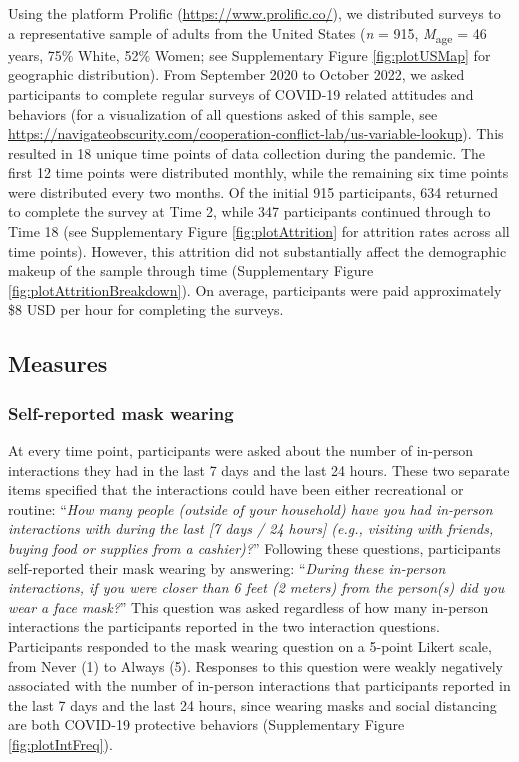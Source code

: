 \documentclass[
  man, donotrepeattitle,floatsintext]{apa6}
\begin{document}
Using the platform Prolific (\url{https://www.prolific.co/}), we distributed surveys to a representative sample of adults from the United States (\emph{n} = 915, \emph{M}\textsubscript{age} = 46 years, 75\% White, 52\% Women; see Supplementary Figure \ref{fig:plotUSMap} for geographic distribution). From September 2020 to October 2022, we asked participants to complete regular surveys of COVID-19 related attitudes and behaviors (for a visualization of all questions asked of this sample, see \url{https://navigateobscurity.com/cooperation-conflict-lab/us-variable-lookup}). This resulted in 18 unique time points of data collection during the pandemic. The first 12 time points were distributed monthly, while the remaining six time points were distributed every two months. Of the initial 915 participants, 634 returned to complete the survey at Time 2, while 347 participants continued through to Time 18 (see Supplementary Figure \ref{fig:plotAttrition} for attrition rates across all time points). However, this attrition did not substantially affect the demographic makeup of the sample through time (Supplementary Figure \ref{fig:plotAttritionBreakdown}). On average, participants were paid approximately \$8 USD per hour for completing the surveys.

\hypertarget{measures}{%
\subsection{Measures}\label{measures}}

\hypertarget{self-reported-mask-wearing}{%
\subsubsection{Self-reported mask wearing}\label{self-reported-mask-wearing}}

At every time point, participants were asked about the number of in-person interactions they had in the last 7 days and the last 24 hours. These two separate items specified that the interactions could have been either recreational or routine: ``\emph{How many people (outside of your household) have you had in-person interactions with during the last {[}7 days / 24 hours{]} (e.g., visiting with friends, buying food or supplies from a cashier)?}'' Following these questions, participants self-reported their mask wearing by answering: ``\emph{During these in-person interactions, if you were closer than 6 feet (2 meters) from the person(s) did you wear a face mask?}'' This question was asked regardless of how many in-person interactions the participants reported in the two interaction questions. Participants responded to the mask wearing question on a 5-point Likert scale, from Never (1) to Always (5). Responses to this question were weakly negatively associated with the number of in-person interactions that participants reported in the last 7 days and the last 24 hours, since wearing masks and social distancing are both COVID-19 protective behaviors (Supplementary Figure \ref{fig:plotIntFreq}).
\end{document}
